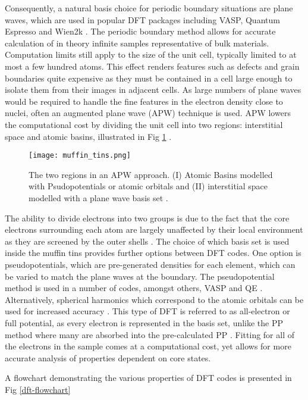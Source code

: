 Consequently, a natural basis choice for periodic boundary situations are plane waves, which are used in popular DFT packages including VASP, Quantum Espresso and Wien2k \cite{qe,vasp,wien2k}.  The periodic boundary method allows for accurate calculation of in theory infinite samples representative of bulk materials.  Computation limits still apply to the size of the unit cell, typically limited to at most a few hundred atoms.  This effect renders features such as defects and grain boundaries quite expensive as they must be contained in a cell large enough to isolate them from their images in adjacent cells. 
As large numbers of plane waves would be required to handle the fine features in the electron density close to nuclei, often an augmented plane wave (APW) technique is used.  APW lowers the computational cost by dividing the unit cell into two regions: interstitial space and atomic basins, illustrated in Fig \ref{MT} \cite{wien2k}. 
\begin{figure}
	\centering
	\texttt{[image: muffin\_tins.png]}
	\caption{The two regions in an APW approach.  (I) Atomic Basins modelled with Psudopotentials or atomic orbitals and (II) interstitial space modelled with a plane wave basis set \cite{wien2k}. }
	\label{MT}   
\end{figure}

The ability to divide electrons into two groups is due to the fact that the core electrons surrounding each atom are largely unaffected by their local environment as they are screened by the outer shells \cite{wien2k}. The choice of which basis set is used inside the muffin tins provides further options between DFT codes.  One option is pseudopotentials, which are pre-generated densities for each element, which can be varied to match the plane waves at the boundary.  The pseudopotential method is used in a number of codes, amongst others, VASP and QE \cite{vasp,qe}.  Alternatively, spherical harmonics which correspond to the atomic orbitals can be used for increased accuracy \cite{griffiths}. This type of DFT is referred to as all-electron or full potential, as every electron is represented in the basis set, unlike the PP method where many are absorbed into the pre-calculated PP \cite{wien2k}. Fitting for all of the electrons in the sample comes at a computational cost, yet allows for more accurate analysis of properties dependent on core states.   
 
 A flowchart demonstrating the various properties of DFT codes is presented in Fig \ref{dft-flowchart}

